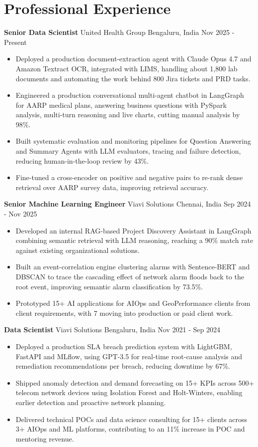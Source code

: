 \documentclass[10pt,a4paper]{article}
\newcommand{\role}[4]{\textbf{#1} \textbar{} #2 \hfill #3 \textbar{} #4\par}
\begin{document}
\section{Professional Experience}
\role{Senior Data Scientist}{United Health Group}{Bengaluru, India}{Nov 2025 - Present}
\begin{itemize}
  \item Deployed a production document-extraction agent with Claude Opus 4.7 and Amazon Textract OCR, integrated with LIMS, handling about 1,800 lab documents and automating the work behind 800 Jira tickets and PRD tasks.
  \item Engineered a production conversational multi-agent chatbot in LangGraph for AARP medical plans, answering business questions with PySpark analysis, multi-turn reasoning and live charts, cutting manual analysis by 98\%.
  \item Built systematic evaluation and monitoring pipelines for Question Answering and Summary Agents with LLM evaluators, tracing and failure detection, reducing human-in-the-loop review by 43\%.
  \item Fine-tuned a cross-encoder on positive and negative pairs to re-rank dense retrieval over AARP survey data, improving retrieval accuracy.
\end{itemize}
\vspace{3pt}
\role{Senior Machine Learning Engineer}{Viavi Solutions}{Chennai, India}{Sep 2024 - Nov 2025}
\begin{itemize}
  \item Developed an internal RAG-based Project Discovery Assistant in LangGraph combining semantic retrieval with LLM reasoning, reaching a 90\% match rate against existing organizational solutions.
  \item Built an event-correlation engine clustering alarms with Sentence-BERT and DBSCAN to trace the cascading effect of network alarm floods back to the root event, improving semantic alarm classification by 73.5\%.
  \item Prototyped 15+ AI applications for AIOps and GeoPerformance clients from client requirements, with 7 moving into production or paid client work.
\end{itemize}
\vspace{3pt}
\role{Data Scientist}{Viavi Solutions}{Bengaluru, India}{Nov 2021 - Sep 2024}
\begin{itemize}
  \item Deployed a production SLA breach prediction system with LightGBM, FastAPI and MLflow, using GPT-3.5 for real-time root-cause analysis and remediation recommendations per breach, reducing downtime by 67\%.
  \item Shipped anomaly detection and demand forecasting on 15+ KPIs across 500+ telecom network devices using Isolation Forest and Holt-Winters, enabling earlier detection and proactive network planning.
  \item Delivered technical POCs and data science consulting for 15+ clients across 3+ AIOps and ML platforms, contributing to an 11\% increase in POC and mentoring revenue.
\end{itemize}
\end{document}
